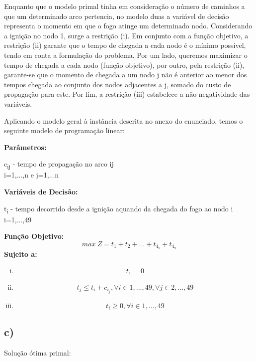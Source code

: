 \documentclass[11pt]{article} %
\begin{document}
Enquanto que o modelo primal tinha em consideração o número de caminhos a que um determinado arco pertencia, no modelo duas a variável de decisão representa o momento em que o fogo atinge um determinado nodo. Considerando a ignição no nodo 1, surge a restrição (i). Em conjunto com a função objetivo, a restrição (ii) garante que o tempo de chegada a cada nodo é o mínimo possível, tendo em conta a formulação do problema. Por um lado, queremos maximizar o tempo de chegada a cada nodo (função objetivo), por outro, pela restrição (ii), garante-se que o momento de chegada a um nodo j não é anterior ao menor dos tempos chegada ao conjunto dos nodos adjacentes a j, somado do custo de propagação para este. Por fim, a restrição (iii) estabelece a não negatividade das variáveis.

Aplicando o modelo geral à instância descrita no anexo do enunciado, temos o seguinte modelo de programação linear: 

\textbf{Parâmetros:}  \\

\begin{center}
c\textsubscript{ij} - tempo de propagação no arco ij\\
i=1,...,n e j=1,...n \\
\end{center}
\textbf{Variáveis de Decisão:} \\
\begin{center}
t\textsubscript{i} - tempo decorrido desde a ignição aquando da chegada do fogo ao nodo i\\
i=1,...,49\\
\end{center}
\textbf{Função Objetivo:} \\
$$max \ Z = t_1+t_2+...+t_4_8+t_4_9$$
\textbf{Sujeito a:}
\begin{enumerate}[(i)]
\item $$t_1 = 0$$
\item $$t_j \leq t_i + c_i_j, \forall i \in 1,...,49 , \forall j \in 2,...,49$$
\item $$t_i \geq 0, \forall i \in 1,...,49$$
\end{enumerate}


\newpage

\subsection*{c)}
Solução ótima primal:
\end{document}
